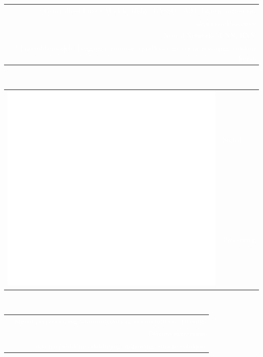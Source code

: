 \documentclass[letterpaper]{article}
\begin{document}
\begin{minipage}[t]{1.\linewidth}
\begin{minipage}{0.47\linewidth}
{\begin{minipage}{1\linewidth}
\begin{minipage}{1\linewidth}
\begin{minipage}[t]{0.47\linewidth}
			\vspace{1ex}
			\begin{minipage}{1\linewidth}
				\textcolor{white}{\small
				\begin{tabularx}{1\textwidth}{lR}
					\smallskip
					& \textmd{Generalized Linear Models:} {\scriptsize Ridge, 
					LASSO, SVM, logistic regression}\\
					\smallskip
					& \textmd{Gaussian Processes}\\
					\smallskip
					& \textmd{Neural Networks:} {\scriptsize CNN, RNN}\\
					\smallskip
					& \textmd{Ensemble models:} {\scriptsize Bagging estimator, 
					AdaBoost, gradient boosting, random forest}\\
				\end{tabularx}
				} 
			\end{minipage}
			\vspace{2ex}
		\end{minipage}
	\end{minipage}\\ %
	\begin{minipage}{1\linewidth} %
		\begin{minipage}[t]{0.47\linewidth}
			\begin{tabularx}{1\textwidth}{rX}
				\multirow{2}{*}{\includegraphics[width=0.18\linewidth]{signal.eps}}
				& \large\textmd{\textcolor{white}{Signal}}\\
				& \large\textmd{\textcolor{white}{Processing}}\\
			\end{tabularx}\\
			\vspace{1ex}
			\begin{minipage}{1\linewidth}
				\textcolor{white}{\small
				\begin{tabularx}{1\textwidth}{cR}
					& \textmd{Signal preprocessing:} {\scriptsize 
					standardization, normalization, filtering}\\
					& \textmd{Feature extraction} \\
					& \textmd{inverse problems:} {\scriptsize debluring, 
					denoising, 
					superresolution}\\
				\end{tabularx}
}
\end{minipage}
\end{minipage}
\end{minipage}
\end{minipage}}
\end{minipage}
\end{minipage}
\end{document}
